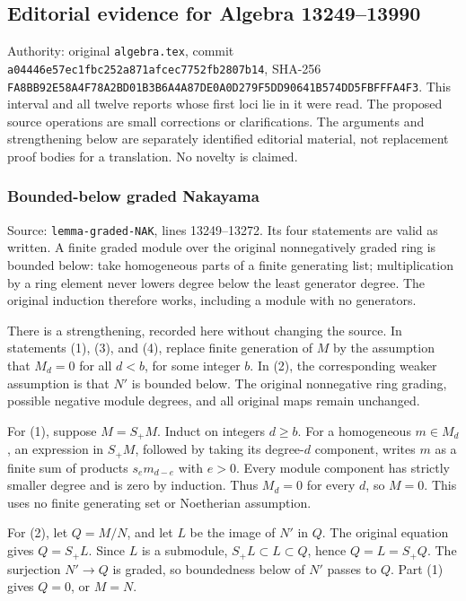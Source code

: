 \subsection{Editorial evidence for Algebra 13249--13990}\label{algebra-proof-002-editorial-evidence-for-algebra-1324913990}

Authority: original \texttt{algebra.tex}, commit \texttt{a04446e57ec1fbc252a871afcec7752fb2807b14}, SHA-256 \texttt{FA8BB92E58A4F78A2BD01B3B6A4A87DE0A0D279F5DD90641B574DD5FBFFFA4F3}. This interval and all twelve reports whose first loci lie in it were read. The proposed source operations are small corrections or clarifications. The arguments and strengthening below are separately identified editorial material, not replacement proof bodies for a translation. No novelty is claimed.

\subsubsection{Bounded-below graded Nakayama}\label{algebra-proof-002-bounded-below-graded-nakayama}

Source: \texttt{lemma-graded-NAK}, lines 13249--13272. Its four statements are valid as written. A finite graded module over the original nonnegatively graded ring is bounded below: take homogeneous parts of a finite generating list; multiplication by a ring element never lowers degree below the least generator degree. The original induction therefore works, including a module with no generators.

There is a strengthening, recorded here without changing the source. In statements (1), (3), and (4), replace finite generation of \(M\) by the assumption that \(M_d=0\) for all \(d<b\), for some integer \(b\). In (2), the corresponding weaker assumption is that \(N'\) is bounded below. The original nonnegative ring grading, possible negative module degrees, and all original maps remain unchanged.

For (1), suppose \(M=S_+M\). Induct on integers \(d\geq b\). For a homogeneous \(m\in M_d\), an expression in \(S_+M\), followed by taking its degree-\(d\) component, writes \(m\) as a finite sum of products \(s_e m_{d-e}\) with \(e>0\). Every module component has strictly smaller degree and is zero by induction. Thus \(M_d=0\) for every \(d\), so \(M=0\). This uses no finite generating set or Noetherian assumption.

For (2), let \(Q=M/N\), and let \(L\) be the image of \(N'\) in \(Q\). The original equation gives \(Q=S_+L\). Since \(L\) is a submodule, \(S_+L\subset L\subset Q\), hence \(Q=L=S_+Q\). The surjection \(N'\to Q\) is graded, so boundedness below of \(N'\) passes to \(Q\). Part (1) gives \(Q=0\), or \(M=N\).

